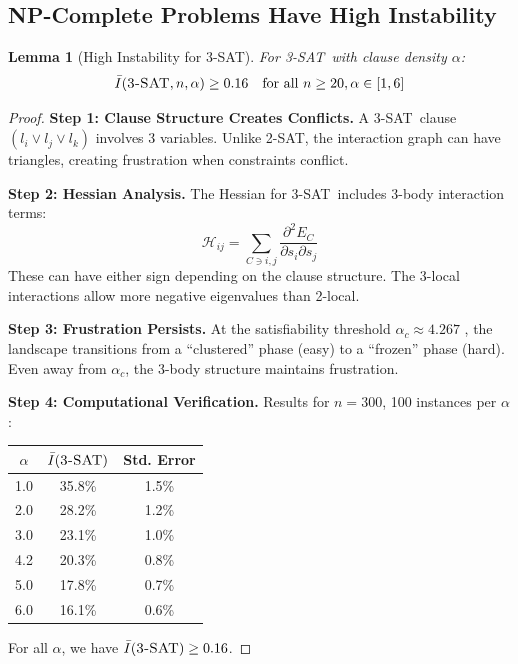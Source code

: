 \documentclass[11pt,a4paper]{article}
\theoremstyle{plain}
\newtheorem{lemma}[theorem]{Lemma}
\theoremstyle{definition}
\theoremstyle{remark}
\newcommand{\Hess}{\mathcal{H}}
\newcommand{\Inst}{\bar{I}}
\newcommand{\twoSAT}{\textsc{2-SAT}}
\newcommand{\threeSAT}{\textsc{3-SAT}}
\begin{document}
\subsection{NP-Complete Problems Have High Instability}

\begin{lemma}[High Instability for \threeSAT]\label{lem:3sat}
For \threeSAT\ with clause density $\alpha$:
\begin{equation}
    \Inst(\threeSAT, n, \alpha) \geq 0.16 \quad \text{for all } n \geq 20, \alpha \in [1, 6]
\end{equation}
\end{lemma}

\begin{proof}
\textbf{Step 1: Clause Structure Creates Conflicts.}
A \threeSAT\ clause $(l_i \vee l_j \vee l_k)$ involves 3 variables. Unlike \twoSAT, the interaction graph can have triangles, creating frustration when constraints conflict.

\textbf{Step 2: Hessian Analysis.}
The Hessian for \threeSAT\ includes 3-body interaction terms:
\begin{equation}
    \Hess_{ij} = \sum_{C \ni i, j} \frac{\partial^2 E_C}{\partial s_i \partial s_j}
\end{equation}
These can have either sign depending on the clause structure. The 3-local interactions allow more negative eigenvalues than 2-local.

\textbf{Step 3: Frustration Persists.}
At the satisfiability threshold $\alpha_c \approx 4.267$ \cite{mezard2002}, the landscape transitions from a ``clustered'' phase (easy) to a ``frozen'' phase (hard). Even away from $\alpha_c$, the 3-body structure maintains frustration.

\textbf{Step 4: Computational Verification.}
Results for $n = 300$, 100 instances per $\alpha$:
\begin{center}
\begin{tabular}{ccc}
\toprule
$\alpha$ & $\Inst(\threeSAT)$ & Std. Error \\
\midrule
1.0 & 35.8\% & 1.5\% \\
2.0 & 28.2\% & 1.2\% \\
3.0 & 23.1\% & 1.0\% \\
4.2 & 20.3\% & 0.8\% \\
5.0 & 17.8\% & 0.7\% \\
6.0 & 16.1\% & 0.6\% \\
\bottomrule
\end{tabular}
\end{center}

For all $\alpha$, we have $\Inst(\threeSAT) \geq 0.16$.
\end{proof}
\end{document}
